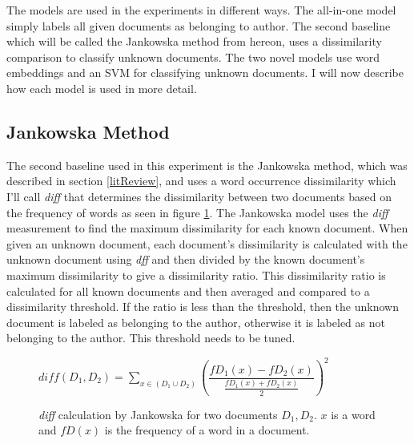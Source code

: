 \documentclass[11pt]{article}
\begin{document}
The models are used in the experiments in different ways. The all-in-one model simply labels all given documents as belonging to author. The second baseline which will be called the Jankowska method from hereon, uses a dissimilarity comparison to classify unknown documents. The two novel models use word embeddings and an SVM for classifying unknown documents. I will now describe how each model is used in more detail.

\subsection{Jankowska Method}\label{Jankowska}
The second baseline used in this experiment is the Jankowska method, which was described in section \ref{litReview}, and uses a word occurrence dissimilarity which I'll call \textit{diff} that determines the dissimilarity between two documents based on the frequency of words as seen in figure \ref{diff}. The Jankowska model uses the \textit{diff} measurement to find the maximum dissimilarity for each known document. When given an unknown document, each document's dissimilarity is calculated with the unknown document using \textit{dff} and then divided by the known document's maximum dissimilarity to give a dissimilarity ratio. This dissimilarity ratio is calculated for all known documents and then averaged and compared to a dissimilarity threshold. If the ratio is less than the threshold, then the unknown document is labeled as belonging to the author, otherwise it is labeled as not belonging to the author. This threshold needs to be tuned.

\begin{figure}[h!]\label{diff}
  \caption{\textit{diff} calculation by Jankowska for two documents $D_1, D_2$. $x$ is a word and $fD(x)$ is the frequency of a word in a document.}
  ${diff(D_1, D_2)= \sum_{x\in(D_1 \cup D_2)}{(\dfrac{fD_1(x)-fD_2(x)}{\frac{fD_1(x)+fD_2(x)}{2}})}^2}$
\end{figure}
\end{document}
